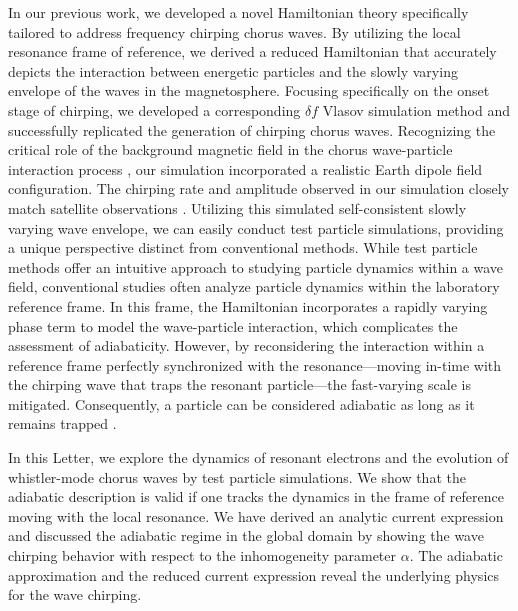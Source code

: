 In our previous work, we developed a novel Hamiltonian theory \cite{zheng2024} specifically tailored to address frequency chirping chorus waves.
By utilizing the local resonance frame of reference, we derived a reduced Hamiltonian that accurately depicts the interaction between energetic particles and the slowly varying envelope of the waves in the magnetosphere.
Focusing specifically on the onset stage of chirping, we developed a corresponding  $\delta f$ Vlasov simulation method and successfully replicated the generation of chirping chorus waves.
Recognizing the critical role of the background magnetic field in the chorus wave-particle interaction process \cite{wu2023,wu_controlling_2020}, our simulation incorporated a realistic Earth dipole field configuration.
The chirping rate and amplitude observed in our simulation closely match satellite observations \cite{cully_observational_2011}. 
Utilizing this simulated self-consistent slowly varying wave envelope, we can easily conduct test particle simulations, providing a unique perspective distinct from conventional methods.
While test particle methods \cite{huanghua_test_ptc,omura_test_ptc,tao_test_ptc} offer an intuitive approach to studying particle dynamics within a wave field, conventional studies often analyze particle dynamics within the laboratory reference frame. In this frame, the Hamiltonian incorporates  a rapidly varying phase term to model the wave-particle interaction, which complicates the assessment of adiabaticity. However, by reconsidering the interaction within a reference frame perfectly synchronized with the resonance—moving in-time with the chirping wave that traps the resonant particle—the fast-varying scale is mitigated. Consequently, a particle can be considered adiabatic as long as it remains trapped  \cite{CARY1989287}.

In this Letter, we  explore the dynamics of resonant electrons and the evolution of whistler-mode chorus waves by test particle simulations.
We show that the adiabatic description is valid if one tracks the dynamics in the frame of reference moving with the local resonance.
We have derived an analytic current expression and discussed the adiabatic regime in the global domain by showing the wave chirping behavior with respect to the inhomogeneity parameter $\alpha$.
The adiabatic approximation and the reduced current expression reveal the underlying physics for the wave chirping.


